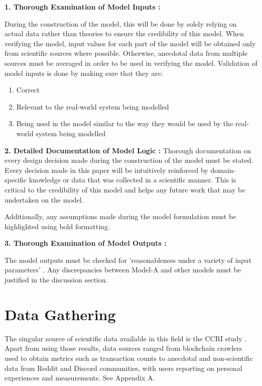 \textbf{1. Thorough Examination of Model Inputs :}

During the construction of the model, this will be done by solely relying on actual data rather than theories to ensure the credibility of this model. When verifying the model, input values for each part of the model will be obtained only from scientific sources where possible. Otherwise, anecdotal data from multiple sources must be averaged in order to be used in verifying the model. Validation of model inputs is done by making sure that they are:
\begin{enumerate}
    \item Correct
    \item Relevant to the real-world system being modelled
    \item Being used in the model similar to the way they would be used by the real-world system being modelled
\end{enumerate}  


\textbf{2. Detailed Documentation of Model Logic :}
Thorough documentation on every design decision made during the construction of the model must be stated. Every decision made in this paper will be intuitively reinforced by domain-specific knowledge or data that was collected in a scientific manner. This is critical to the credibility of this model and helps any future work that may be undertaken on the model.

Additionally, any assumptions made during the model formulation must be highlighted using bold formatting.


\textbf{3. Thorough Examination of Model Outputs :}

The model outputs must be checked for 'reasonableness under a variety of input parameters' \cite{Al-Aomar2015ModelTechniques}. Any discrepancies between Model-A and other models must be justified in the discussion section.   


\section {Data Gathering}

The singular source of scientific data available in this field is the CCRI study \cite{CryptoCarbonRatingsInstitute2022TheNetwork}. Apart from using those results, data sources ranged from blockchain crawlers used to obtain metrics such as transaction counts to anecdotal and non-scientific data from Reddit and Discord communities, with users reporting on personal experiences and measurements. See Appendix A.

